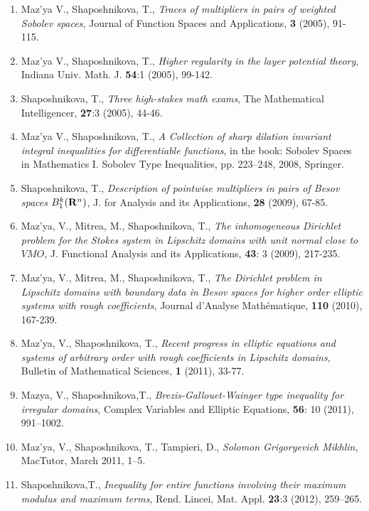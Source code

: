 \documentclass{article}
\begin{document}
\begin{enumerate}
\item Maz'ya V., Shaposhnikova, T., {\it Traces of multipliers in
pairs
of weighted Sobolev spaces},  Journal of Function Spaces
and Applications, {\bf 3} (2005), 91-115.

\item Maz'ya V., Shaposhnikova, T., {\it Higher regularity in the layer potential theory}, Indiana Univ.
Math. J. {\bf 54}:1 (2005), 99-142. 

\item Shaposhnikova, T., {\it Three high-stakes math exams},  The Mathematical Intelligencer, {\bf 27}:3 (2005), 44-46.

\item Maz'ya V., Shaposhnikova, T., {\it  A Collection of sharp dilation invariant integral inequalities
for differentiable functions}, in the book: Sobolev Spaces in Mathematics I. Sobolev Type Inequalities, pp. 223--248, 2008, Springer.

\item Shaposhnikova, T., 
{\it Description of pointwise multipliers in pairs of Besov spaces $B_1^k({\bf R}^n)$}, 
  J. for Analysis and its Applications, {\bf 28} (2009), 67-85.

 \item Maz'ya, V., Mitrea, M., Shaposhnikova, T., 
 {\it The inhomogeneous Dirichlet problem for the Stokes system in Lipschitz domains with unit normal close to $VMO$}, J.  Functional  Analysis and its Applications, {\bf 43}: 3 (2009), 217-235.


 \item Maz'ya, V., Mitrea, M., Shaposhnikova, T., 
 {\it The  Dirichlet problem in Lipschitz domains with boundary data in Besov spaces for higher order elliptic systems with rough coefficients}, 
{Journal d'Analyse Math\'ematique}, 
{\bf 110} (2010), 
{167-239}.

\item {Maz'ya, V., Shaposhnikova, T.}, 
{\it Recent progress in elliptic equations and systems of arbitrary order with rough coefficients in Lipschitz domains}, {Bulletin of Mathematical Sciences}, {\bf 1} (2011), 33-77. 

\item{Mazya, V., Shaposhnikova,T.}, 
{\it Brezis-Gallouet-Wainger type inequality for irregular domains}, 
  {Complex Variables and Elliptic Equations}, 
 {\bf 56}: {10} (2011),  {991--1002}. 

\item {Maz'ya, V., Shaposhnikova, T., Tampieri, D.}, 
{\it Solomon Grigoryevich Mikhlin}, 
 {MacTutor, March 2011}, {1--5}.

\item{Shaposhnikova,T.}, 
{\it Inequality for entire functions involving their maximum modulus and maximum terms}, Rend. Lincei, Mat. Appl. {\bf 23}:3 (2012),   259--265.


\end{enumerate}
\end{document}
